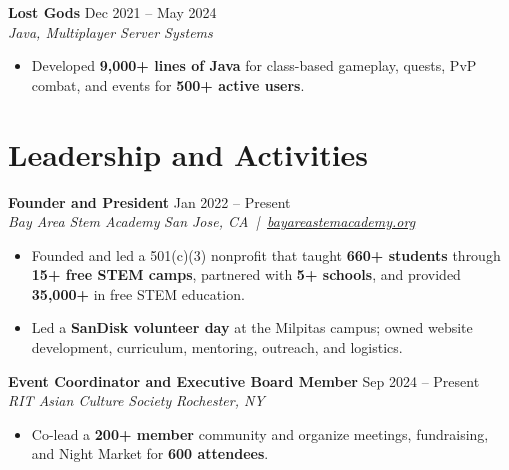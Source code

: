 \documentclass[10pt,letterpaper]{article}
\newcommand{\resumeRole}[4]{%
  \textbf{#1} \hfill #2\\
  \textit{#3} \hfill \textit{#4}
}
\newcommand{\majorGap}{\vspace{1pt plus 2fill}}
\newcommand{\entryGap}{\vspace{0pt plus 1fill}}
\begin{document}
\entryGap
\resumeRole{Lost Gods}{Dec 2021 -- May 2024}{Java, Multiplayer Server Systems}{ }
\begin{itemize}
  \item Developed \textbf{9,000+ lines of Java} for class-based gameplay, quests, PvP combat, and events for \textbf{500+ active users}.
\end{itemize}

\majorGap
\section*{Leadership and Activities}
\resumeRole{Founder and President}{Jan 2022 -- Present}{Bay Area Stem Academy}{San Jose, CA \,|\, \href{https://bayareastemacademy.org}{bayareastemacademy.org}}
\begin{itemize}
  \item Founded and led a 501(c)(3) nonprofit that taught \textbf{660+ students} through \textbf{15+ free STEM camps}, partnered with \textbf{5+ schools}, and provided \textbf{\textdollar{}35,000+} in free STEM education.
  \item Led a \textbf{SanDisk volunteer day} at the Milpitas campus; owned website development, curriculum, mentoring, outreach, and logistics.
\end{itemize}

\entryGap
\resumeRole{Event Coordinator and Executive Board Member}{Sep 2024 -- Present}{RIT Asian Culture Society}{Rochester, NY}
\begin{itemize}
  \item Co-lead a \textbf{200+ member} community and organize meetings, fundraising, and Night Market for \textbf{600 attendees}.
\end{itemize}
\end{document}
